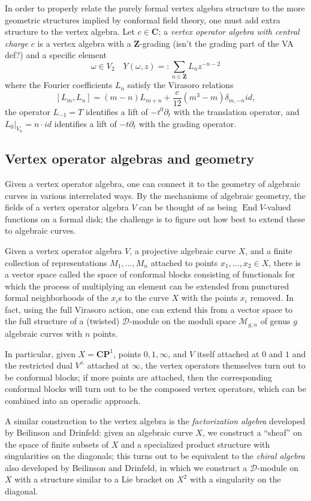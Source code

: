 \documentclass{article}
\newcommand{\CC}{\mathbold{C}}
\newcommand{\ZZ}{\mathbold{Z}}
\newcommand{\CP}{\mathbold{CP}}
\newcommand{\Dd}{\mathcal{D}}
\DeclareMathOperator{\End}{End}
\begin{document}
In order to properly relate the purely formal vertex algebra structure to the more geometric structures implied by conformal field theory, one must add extra structure to the vertex algebra.  Let $c \in \CC$; a \textit{vertex operator algebra with central charge $c$} is a vertex algebra with a $\ZZ$-grading (isn't the grading part of the VA def?) and a specific element
\[\omega \in V_2 \quad Y(\omega,z) =: \sum_{n \in \ZZ} L_n z^{-n-2} \]
where the Fourier coefficients $L_n$ satisfy the Virasoro relations
\[[L_m,L_n]=(m-n)L_{m+n}+\frac{c}{12}(m^3-m)\delta_{m,-n} id, \]
the operator $L_{-1}=T$ identifies a lift of $-t^0\partial_t$ with the translation operator, and $L_0|_{V_n}=n \cdot id$ identifies a lift of $-t\partial_t$ with the grading operator.

\subsection{Vertex operator algebras and geometry}
Given a vertex operator algebra, one can connect it to the geometry of algebraic curves in various interrelated ways.  By the mechanisms of algebraic geometry, the fields of a vertex operator algebra $V$ can be thought of as being $\End V$-valued functions on a formal disk; the challenge is to figure out how best to extend these to algebraic curves.

Given a vertex operator algebra $V$, a projective algebraic curve $X$, and a finite collection of representations $M_1,...,M_n$ attached to points $x_1,...,x_2 \in X$, there is a vector space called the space of conformal blocks consisting of functionals for which the process of multiplying an element can be extended from punctured formal neighborhoods of the $x_i$s to the curve $X$ with the points $x_i$ removed.  In fact, using the full Virasoro action, one can extend this from a vector space to the full structure of a (twisted) $\Dd$-module on the moduli space $\mathcal{M}_{g,n}$ of genus $g$ algebraic curves with $n$ points.

In particular, given $X=\CP^1$, points $0,1,\infty$, and $V$ itself attached at $0$ and $1$ and the restricted dual $V^\wedge$ attached at $\infty$, the vertex operators themselves turn out to be conformal blocks; if more points are attached, then the corresponding conformal blocks will turn out to be the composed vertex operators, which can be combined into an operadic approach.

A similar construction to the vertex algebra is the \textit{factorization algebra} developed by Beilinson and Drinfeld: given an algebraic curve $X$, we construct a ``sheaf'' on the space of finite subsets of $X$ and a specialized product structure with singularities on the diagonals; this turns out to be equivalent to the \textit{chiral algebra} also developed by Beilinson and Drinfeld, in which we construct a $\Dd$-module on $X$ with a structure similar to a Lie bracket on $X^2$ with a singularity on the diagonal.
\end{document}
